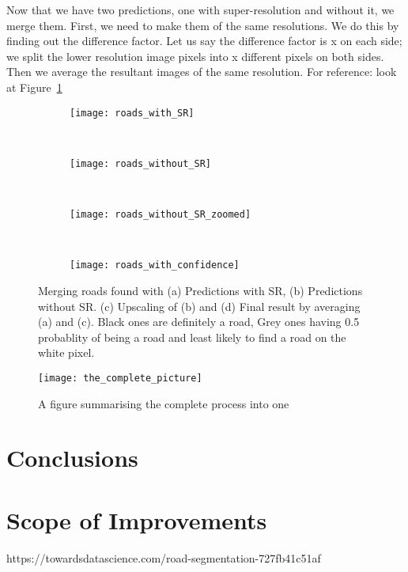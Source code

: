 
Now that we have two predictions, one with super-resolution and without it, we merge them. First, we need to make them of the same resolutions. We do this by finding out the difference factor. Let us say the difference factor is x on each side; we split the lower resolution image pixels into x different pixels on both sides. Then we average the resultant images of the same resolution. For reference: look at Figure~\ref{fig:roads_in_confidence}

\begin{figure}[h!]
  \begin{subfigure}[b]{0.25\textwidth}
    \texttt{[image: roads\_with\_SR]}
    \caption{}
  \end{subfigure}~
  \begin{subfigure}[b]{0.15\textwidth}
    \texttt{[image: roads\_without\_SR]}
    \caption{}
  \end{subfigure}~
  \begin{subfigure}[b]{0.25\textwidth}
    \texttt{[image: roads\_without\_SR\_zoomed]}
    \caption{}
  \end{subfigure}~
  \begin{subfigure}[b]{0.25\textwidth}
    \texttt{[image: roads\_with\_confidence]}
    \caption{}
  \end{subfigure}
  \caption[Finding likelihood of roads in predictions.]{Merging roads found with (a) Predictions with SR, (b) Predictions without SR. (c) Upscaling of (b) and (d) Final result by averaging (a) and (c). Black ones are definitely a road, Grey ones having 0.5 probablity of being a road and  least likely to find a road on the white pixel.}
  \label{fig:roads_in_confidence}
\end{figure}




\begin{sidewaysfigure}
  \centering
  \texttt{[image: the\_complete\_picture]}
  \caption{A figure summarising the complete process into one}
  \label{fig:the_complete_picture}
\end{sidewaysfigure}


\chapter{Conclusions}
\chapter{Scope of Improvements}
https://towardsdatascience.com/road-segmentation-727fb41c51af
\pagebreak
